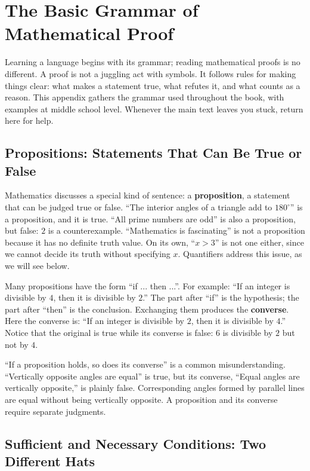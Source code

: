 \chapter{The Basic Grammar of Mathematical Proof}

Learning a language begins with its grammar; reading mathematical proofs is no different. A proof is not a juggling act with symbols. It follows rules for making things clear: what makes a statement true, what refutes it, and what counts as a reason. This appendix gathers the grammar used throughout the book, with examples at middle school level. Whenever the main text leaves you stuck, return here for help.

\section{Propositions: Statements That Can Be True or False}

Mathematics discusses a special kind of sentence: a \textbf{proposition}, a statement that can be judged true or false. ``The interior angles of a triangle add to $180^\circ$'' is a proposition, and it is true. ``All prime numbers are odd'' is also a proposition, but false: $2$ is a counterexample. ``Mathematics is fascinating'' is not a proposition because it has no definite truth value. On its own, ``$x>3$'' is not one either, since we cannot decide its truth without specifying $x$. Quantifiers address this issue, as we will see below.

Many propositions have the form ``if ... then ...''. For example: ``If an integer is divisible by $4$, then it is divisible by $2$.'' The part after ``if'' is the hypothesis; the part after ``then'' is the conclusion. Exchanging them produces the \textbf{converse}. Here the converse is: ``If an integer is divisible by $2$, then it is divisible by $4$.'' Notice that the original is true while its converse is false: $6$ is divisible by $2$ but not by $4$.

\begin{fanli}
``If a proposition holds, so does its converse'' is a common misunderstanding. ``Vertically opposite angles are equal'' is true, but its converse, ``Equal angles are vertically opposite,'' is plainly false. Corresponding angles formed by parallel lines are equal without being vertically opposite. A proposition and its converse require separate judgments.
\end{fanli}

\section{Sufficient and Necessary Conditions: Two Different Hats}

